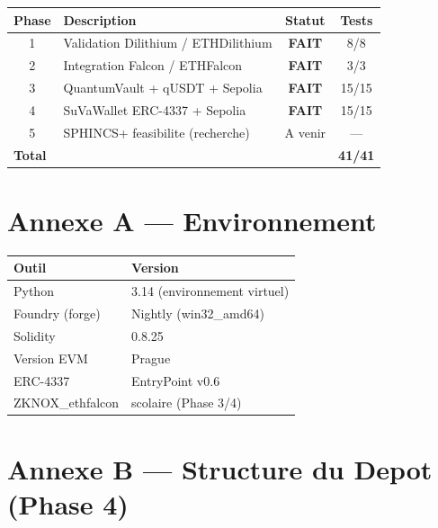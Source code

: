 \documentclass[11pt,a4paper]{article}
\begin{document}
\begin{center}
\begin{tabular}{clcc}
\toprule
\textbf{Phase} & \textbf{Description} & \textbf{Statut} & \textbf{Tests} \\
\midrule
1  & Validation Dilithium / ETHDilithium       & \textcolor{pass-green}{\textbf{FAIT}} &  8/8 \\
2  & Integration Falcon / ETHFalcon            & \textcolor{pass-green}{\textbf{FAIT}} &  3/3 \\
3  & QuantumVault + qUSDT + Sepolia            & \textcolor{pass-green}{\textbf{FAIT}} & 15/15 \\
4  & SuVaWallet ERC-4337 + Sepolia             & \textcolor{pass-green}{\textbf{FAIT}} & 15/15 \\
5  & SPHINCS+ feasibilite (recherche)          & A venir & --- \\
\midrule
\multicolumn{2}{l}{\textbf{Total}} & & \textbf{41/41} \\
\bottomrule
\end{tabular}
\end{center}

\appendix
\section{Annexe A --- Environnement}

\begin{center}
\begin{tabular}{ll}
\toprule
\textbf{Outil} & \textbf{Version} \\
\midrule
Python          & 3.14 (environnement virtuel) \\
Foundry (forge) & Nightly (win32\_amd64) \\
Solidity        & 0.8.25 \\
Version EVM     & Prague \\
ERC-4337        & EntryPoint v0.6 \\
ZKNOX\_ethfalcon & scolaire (Phase 3/4) \\
\bottomrule
\end{tabular}
\end{center}

\section{Annexe B --- Structure du Depot (Phase 4)}
\end{document}
